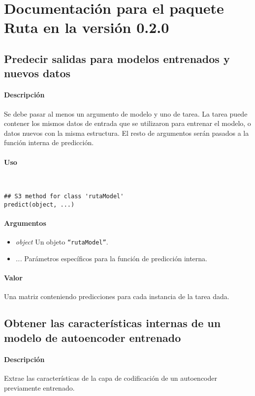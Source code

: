 \section{Documentación para el paquete Ruta en la versión 0.2.0}

\subsection{Predecir salidas para modelos entrenados y nuevos datos}

\paragraph{Descripción}
Se debe pasar al menos un argumento de modelo y uno de tarea. La tarea puede contener los mismos datos de entrada que se utilizaron para entrenar el modelo, o datos nuevos con la misma estructura. El resto de argumentos serán pasados a la función interna de predicción.

\paragraph{Uso}
~

\begin{lstlisting}
## S3 method for class 'rutaModel'
predict(object, ...)\end{lstlisting}

\paragraph{Argumentos}
\begin{itemize}
\item \emph{object}	Un objeto \texttt{``rutaModel''}.
\item \emph{...}	Parámetros específicos para la función de predicción interna.
\end{itemize}

\paragraph{Valor}
Una matriz conteniendo predicciones para cada instancia de la tarea dada.

\subsection{Obtener las características internas de un modelo de autoencoder entrenado}

\paragraph{Descripción}
Extrae las características de la capa de codificación de un autoencoder previamente entrenado.

